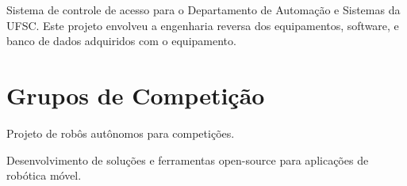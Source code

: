 \documentclass[A4]{deedy-resume} %
\begin{document}
\begin{minipage}[t]{0.66\textwidth}
\sectionspace %

\begin{tightitemize}
 \item Sistema de controle de acesso para o Departamento de Automação e Sistemas da UFSC. Este projeto envolveu a engenharia reversa dos equipamentos, software, e banco de dados adquiridos com o equipamento.
 \end{tightitemize}
 
\sectionspace %


\section{Grupos de Competição}

\sectionspace %


\vspace{\topsep} %
\begin{tightitemize}
 \item Projeto de robôs autônomos para competições.
 \item Desenvolvimento de soluções e ferramentas open-source para aplicações de robótica móvel.
\end{tightitemize}









\end{minipage} %

\end{document}
